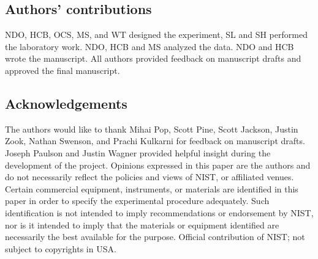 \documentclass{bmcart}
\begin{document}
\begin{backmatter}
\subsection*{Authors' contributions}
NDO, HCB, OCS, MS, and WT designed the experiment, SL and SH performed the laboratory work.
NDO, HCB and MS analyzed the data.
NDO and HCB wrote the manuscript.
All authors provided feedback on manuscript drafts and approved the final manuscript.


\subsection*{Acknowledgements}
 The authors would like to thank Mihai
Pop, Scott Pine, Scott Jackson, Justin Zook, Nathan Swenson, and Prachi Kulkarni for
feedback on manuscript drafts. Joseph Paulson and Justin Wagner provided
helpful insight during the development of the project.
Opinions expressed in this paper are the
authors and do not necessarily reflect the policies and views of NIST,
or affiliated venues. Certain commercial equipment, instruments, or
materials are identified in this paper in order to specify the
experimental procedure adequately. Such identification is not intended
to imply recommendations or endorsement by NIST, nor is it intended to
imply that the materials or equipment identified are necessarily the
best available for the purpose. Official contribution of NIST; not
subject to copyrights in USA.







\end{backmatter}
\end{document}
